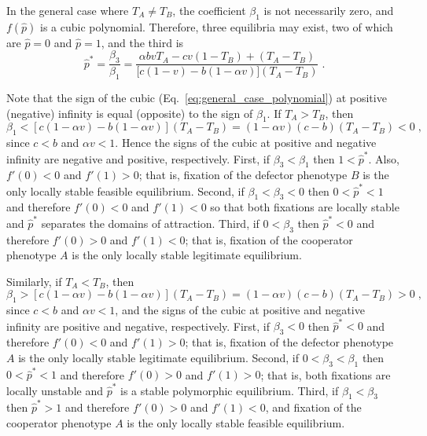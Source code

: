 \documentclass[12pt]{extarticle}
\begin{document}
In the general case where $T_A \neq T_B$, the coefficient $\beta_1$ is not necessarily zero, and $f(\hat{p})$ is a cubic polynomial.
Therefore, three equilibria may exist, two of which are
$\hat{p} = 0 $ and $\hat{p} = 1$, and the third is
\begin{equation} \label{eq:general_equilibrium}
  \hat{p}^* =  
  \frac{\beta_3}{\beta_1} =
  \frac{\alpha bvT_A - cv(1-T_B) + (T_A-T_B)}{\big[c(1-v) - b (1-\alpha v)\big] (T_A-T_B)} \;.
\end{equation}

Note that the sign of the cubic (Eq.\ \ref{eq:general_case_polynomial}) at positive (negative) infinity is equal (opposite) to the sign of $\beta_1$. 
If $T_A>T_B$, then 
\begin{equation} \label{eq:beta1}
   \beta_1 < [c(1-\alpha v) - b(1-\alpha v)] (T_A-T_B) 
   = (1-\alpha v)(c-b)(T_A-T_B) < 0 \;,
 \end{equation}
since $c<b$ and $\alpha v < 1$. Hence the signs of the cubic at positive and negative infinity are negative and positive, respectively.
First, if $\beta_3<\beta_1$ then 
$1<\hat{p}^*$. Also, $f'(0)<0$ and $f'(1)>0$; that is, fixation of the defector phenotype $B$ is the only locally stable feasible equilibrium.
Second, if $\beta_1<\beta_3<0$ then 
$0<\hat{p}^*<1$ and therefore $f'(0)<0$ and $f'(1)<0$ so that both fixations are locally stable and $\hat{p}^*$ separates the domains of attraction.
Third, if $0<\beta_3$ then 
$\hat{p}^*<0$ and therefore $f'(0)>0$ and $f'(1)<0$; that is, fixation of the cooperator phenotype $A$ is the only locally stable legitimate equilibrium.

Similarly, if $T_A<T_B$, then
\begin{equation} \label{eq:beta1_rev}
   \beta_1 > [c(1-\alpha v) - b(1-\alpha v)] (T_A-T_B) 
   = (1-\alpha v)(c-b)(T_A-T_B) > 0 \;,
 \end{equation}
since $c<b$ and $\alpha v < 1$, and the signs of the cubic at positive and negative infinity are positive and negative, respectively. 
First, if $\beta_3<0$ then $\hat{p}^*<0$ and therefore $f'(0)<0$ and $f'(1)>0$; that is, fixation of the defector phenotype $A$ is the only locally stable legitimate equilibrium.
Second, if $0<\beta_3<\beta_1$ then $0<\hat{p}^*<1$ and therefore $f'(0)>0$ and $f'(1)>0$; that is, both fixations are locally unstable and $\hat{p}^*$ is a stable polymorphic equilibrium.
Third, if $\beta_1<\beta_3$ then $\hat{p}^*>1$ and therefore $f'(0)>0$ and $f'(1)<0$, and fixation of the cooperator phenotype $A$ is the only locally stable feasible equilibrium.
\end{document}
